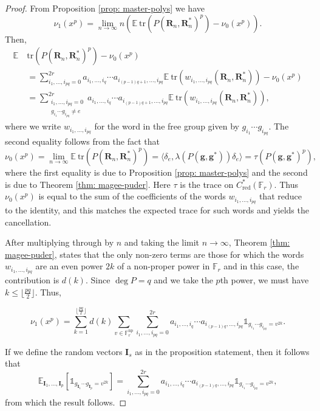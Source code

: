 \documentclass[12pt]{article}
\renewcommand{\tr}{\mathrm{tr}}
\newcommand{\E}{\mathbb{E}}
\newcommand{\F}{\mathbb{F}}
\newcommand{\1}{\mathds{1}}
\newcommand{\g}{\mathbf{g}}
\newcommand{\rn}{\mathbf{R}_n}
\begin{document}
\begin{proof}
From Proposition \ref{prop: master-polys} we have 
         $$\nu_1(x^p) = \lim_{n\to\infty} n\left(\E\ \tr(P(\rn,\rn^*)^p)-\nu_0(x^p)\right).$$
Then,
\begin{align*}
             \E\ &\tr(P(\rn,\rn^*)^p)-\nu_0(x^p) \\
             &= \sum_{i_1,\ldots,i_{pq}=0}^{2r} a_{i_1,\ldots,i_q}\cdots a_{i_{(p-1)q+1},\ldots,i_{pq}}\E\ \tr(w_{i_1,\ldots,i_{pq}}(\rn,\rn^*))-\nu_0(x^p)\\
             &=\sum_{\substack{i_1,\ldots,i_{pq}=0 \\ g_{i_1}\cdots g_{i_{pq}}\neq e}}^{2r} a_{i_1,\ldots,i_q}\cdots a_{i_{(p-1)q+1},\ldots,i_{pq}}\E\ \tr(w_{i_1,\ldots,i_{pq}}(\rn,\rn^*)),
         \end{align*}
     where we write $w_{i_1,\ldots,i_{pq}}$ for the word in the free group given by $g_{i_1}\cdots g_{i_{pq}}$. The second equality follows from the fact that
        $$\nu_0(x^p)=\lim_{n\to\infty}\E\ \tr(P(\rn,\rn^*)^p) =\langle \delta_e,\lambda(P(\g,\g^*))\delta_e\rangle=\tau(P(\g,\g^*)^p),$$
    where the first equality is due to Proposition \ref{prop: master-polys} and the second is due to Theorem \ref{thm: magee-puder}. Here $\tau$ is the trace on $C^*_{\mathrm{red}}(\F_r)$.
    Thus $\nu_0(x^p)$ is equal to the sum of the coefficients of the words $w_{i_1,\ldots,i_{pq}}$ that reduce to the identity, and this matches the expected trace for such words and yields the cancellation.

     After multiplying through by $n$ and taking the limit $n\to\infty$,  Theorem \ref{thm: magee-puder}, states that the only non-zero terms are those for which the words $w_{i_1,\ldots,i_{pq}}$ are an even power $2k$ of a non-proper power in $\F_r$ and in this case, the contribution is $d(k)$. Since $\deg P=q$ and we take the $p$th power, we must have $k\leq\lfloor\frac{pq}{2}\rfloor$. Thus,
     
     $$\nu_1(x^p) = \sum_{k=1}^{\lfloor \frac{pq}{2}\rfloor} d(k)\sum_{v\in \F_r^{\mathrm{np}}}\sum_{i_1,\ldots,i_{pq}=0}^{2r} a_{i_1,\ldots,i_q}\cdots a_{i_{(p-1)q},\ldots,i_{pq}}\1_{g_{i_1}\cdots g_{i_{pq}}=v^{2k}}.$$

     If we define the random vectors $\mathbf{I}_s$ as in the proposition statement, then it follows that
        $$\E_{\mathbf{I}_1,\ldots,\mathbf{I}_p}\left[\1_{g_{\mathbf{I}_1}\cdots g_{\mathbf{I}_{p}}=v^{2k}}\right]=\sum_{i_1,\ldots,i_{pq}=0}^{2r} a_{i_1,\ldots,i_q}\cdots a_{i_{(p-1)q},\ldots,i_{pq}}\1_{g_{i_1}\cdots g_{i_{pq}}=v^{2k}},$$
    from which the result follows.
    
\end{proof}
\end{document}
